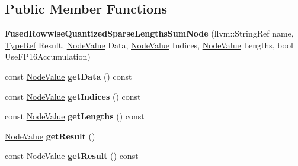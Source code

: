 \subsection*{Public Member Functions}
\begin{DoxyCompactItemize}
\item 
\mbox{\label{classglow_1_1_fused_rowwise_quantized_sparse_lengths_sum_node_ade737c526517f610f64b322c708feb8a}} 
{\bfseries Fused\+Rowwise\+Quantized\+Sparse\+Lengths\+Sum\+Node} (llvm\+::\+String\+Ref name, \hyperlink{structglow_1_1_type}{Type\+Ref} Result, \hyperlink{structglow_1_1_node_value}{Node\+Value} Data, \hyperlink{structglow_1_1_node_value}{Node\+Value} Indices, \hyperlink{structglow_1_1_node_value}{Node\+Value} Lengths, bool Use\+F\+P16\+Accumulation)
\item 
\mbox{\label{classglow_1_1_fused_rowwise_quantized_sparse_lengths_sum_node_a88d0ce787b9ffca590b71c2e0294acb2}} 
const \hyperlink{structglow_1_1_node_value}{Node\+Value} {\bfseries get\+Data} () const
\item 
\mbox{\label{classglow_1_1_fused_rowwise_quantized_sparse_lengths_sum_node_ac55c06aa80265e09fcb9b24cab70b961}} 
const \hyperlink{structglow_1_1_node_value}{Node\+Value} {\bfseries get\+Indices} () const
\item 
\mbox{\label{classglow_1_1_fused_rowwise_quantized_sparse_lengths_sum_node_a2e79fa17357a579f94abeb5d30844750}} 
const \hyperlink{structglow_1_1_node_value}{Node\+Value} {\bfseries get\+Lengths} () const
\item 
\mbox{\label{classglow_1_1_fused_rowwise_quantized_sparse_lengths_sum_node_a6fa2c60431344184823fd05e9287e8ed}} 
\hyperlink{structglow_1_1_node_value}{Node\+Value} {\bfseries get\+Result} ()
\item 
\mbox{\label{classglow_1_1_fused_rowwise_quantized_sparse_lengths_sum_node_a47db72f2f839230ba32c2750a51fad9e}} 
const \hyperlink{structglow_1_1_node_value}{Node\+Value} {\bfseries get\+Result} () const

\end{DoxyCompactItemize}
